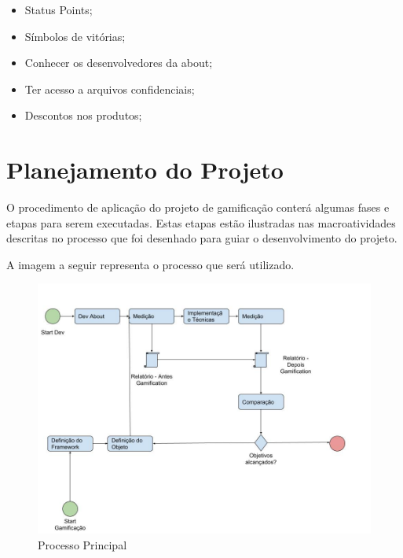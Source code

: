 \begin{itemize}
    \item Status Points;
    \item Símbolos de vitórias;
    \item Conhecer os desenvolvedores da about;
    \item Ter acesso a arquivos confidenciais;
    \item Descontos nos produtos;
\end{itemize}

\section{Planejamento do Projeto}
\label{sub:planejamento_do_projeto}
O procedimento de aplicação do projeto de gamificação conterá algumas fases
e etapas para serem executadas. Estas etapas estão ilustradas nas macroatividades 
descritas no processo que foi desenhado para guiar o desenvolvimento
do projeto.

A imagem a seguir representa o processo que será utilizado.

\begin{figure}[h]
    \centering
    \includegraphics[width=450px, scale=1]{figuras/mainprocess}
    \caption{Processo Principal}
    \label{fig:mainprocess}
\end{figure}

